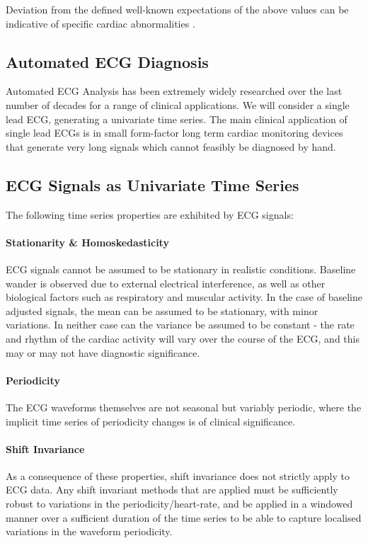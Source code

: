 \documentclass[9pt,conference]{IEEEtran}
\begin{document}
Deviation from the defined well-known expectations of the above values can be indicative of specific cardiac abnormalities \cite{cardioBook}.

\subsection{Automated ECG Diagnosis}
Automated ECG Analysis has been extremely widely researched over the last number of decades for a range of clinical applications. We will consider a single lead ECG, generating a univariate time series. The main clinical application of single lead ECGs is in small form-factor long term cardiac monitoring devices that generate very long signals which cannot feasibly be diagnosed by hand.

\subsection{ECG Signals as Univariate Time Series}
The following time series properties are exhibited by ECG signals:

\paragraph{Stationarity \& Homoskedasticity}
ECG signals cannot be assumed to be stationary in realistic conditions. Baseline wander is observed due to external electrical interference, as well as other biological factors such as respiratory and muscular activity. In the case of baseline adjusted signals, the mean can be assumed to be stationary, with minor variations. In neither case can the variance be assumed to be constant - the rate and rhythm of the cardiac activity will vary over the course of the ECG, and this may or may not have diagnostic significance.

\paragraph{Periodicity}
The ECG waveforms themselves are not seasonal but variably periodic, where the implicit time series of periodicity changes is of clinical significance.


\paragraph{Shift Invariance}
As a consequence of these properties, shift invariance does not strictly apply to ECG data. Any shift invariant methods that are applied must be sufficiently robust to variations in the periodicity/heart-rate, and be applied in a windowed manner over a sufficient duration of the time series to be able to capture localised variations in the waveform periodicity.
\end{document}
